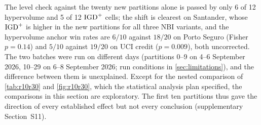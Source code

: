 The level check against the twenty new partitions alone is passed by only 6 of 12 hypervolume and 5 of 12 $\mathrm{IGD}^{+}$
cells; the shift is clearest on Santander, whose $\mathrm{IGD}^{+}$ is higher in the new partitions for all three NBI variants,
and the hypervolume anchor win rates are $6/10$ against $18/20$ on Porto Seguro (Fisher $p = 0.14$) and $5/10$ against
$19/20$ on UCI credit ($p = 0.009$), both uncorrected. The two batches were run on different days (partitions 0--9 on
4--6 September 2026, 10--29 on 6--8 September 2026; run conditions in \cref{sec:limitations}), and the difference between them
is unexplained. Except for the nested
comparison of \cref{tab:r10r30} and \cref{fig:r10r30}, which the statistical analysis plan specified, the comparisons
in this section are exploratory. The first ten partitions thus gave the direction of every established effect but not
every conclusion (supplementary Section~S11).